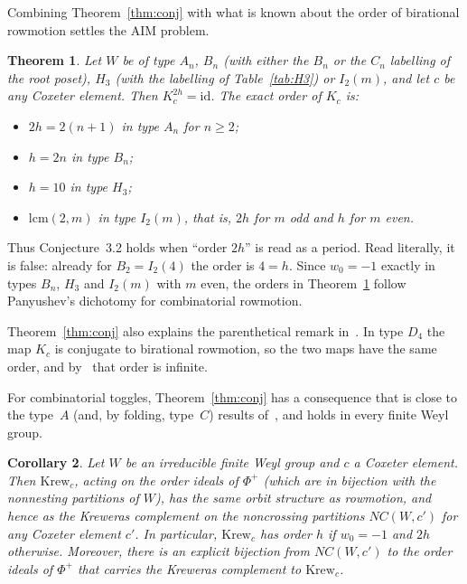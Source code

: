 \documentclass[11pt]{amsart}
\newtheorem{theorem}{Theorem}[section]
\newtheorem{corollary}[theorem]{Corollary}
\theoremstyle{definition}
\begin{document}
Combining Theorem~\ref{thm:conj} with what is known about the order of birational rowmotion settles the AIM problem.

\begin{theorem}\label{thm:main}
Let $W$ be of type $A_n$, $B_n$ (with either the $B_n$ or the $C_n$ labelling of the root poset), $H_3$ (with the labelling of Table~\ref{tab:H3}) or $I_2(m)$, and let $c$ be any Coxeter element. Then $K_c^{2h}=\mathrm{id}$. The exact order of $K_c$ is:
\begin{itemize}
\item $2h=2(n+1)$ in type $A_n$ for $n\ge2$;
\item $h=2n$ in type $B_n$;
\item $h=10$ in type $H_3$;
\item $\mathrm{lcm}(2,m)$ in type $I_2(m)$, that is, $2h$ for $m$ odd and $h$ for $m$ even.
\end{itemize}
\end{theorem}

Thus Conjecture~3.2 holds when ``order $2h$'' is read as a period. Read literally, it is false: already for $B_2=I_2(4)$ the order is $4=h$. Since $w_0=-1$ exactly in types $B_n$, $H_3$ and $I_2(m)$ with $m$ even, the orders in Theorem~\ref{thm:main} follow Panyushev's dichotomy for combinatorial rowmotion.

Theorem~\ref{thm:conj} also explains the parenthetical remark in~\cite{AIM}. In type $D_4$ the map $K_c$ is conjugate to birational rowmotion, so the two maps have the same order, and by~\cite[\S21]{GR1} that order is infinite.

For combinatorial toggles, Theorem~\ref{thm:conj} has a consequence that is close to the type~$A$ (and, by folding, type~$C$) results of~\cite{DFISTW}, and holds in every finite Weyl group.

\begin{corollary}\label{cor:krew}
Let $W$ be an irreducible finite Weyl group and $c$ a Coxeter element. Then $\mathrm{Krew}_c$, acting on the order ideals of $\Phi^+$ (which are in bijection with the nonnesting partitions of $W$), has the same orbit structure as rowmotion, and hence as the Kreweras complement on the noncrossing partitions $NC(W,c')$ for any Coxeter element $c'$. In particular, $\mathrm{Krew}_c$ has order $h$ if $w_0=-1$ and $2h$ otherwise. Moreover, there is an explicit bijection from $NC(W,c')$ to the order ideals of $\Phi^+$ that carries the Kreweras complement to $\mathrm{Krew}_c$.
\end{corollary}
\end{document}
